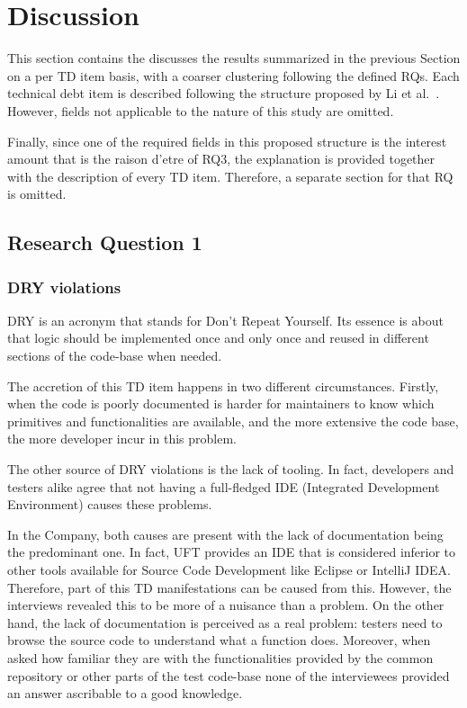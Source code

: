\chapter{Discussion} \label{sec:discussion}

This section contains the discusses the results summarized in the previous Section on a per TD item basis, with a coarser clustering following the defined RQs. Each technical debt item is described following the structure proposed by Li et al.\ \cite{mapping_study_td}. However, fields not applicable to the nature of this study are omitted.

Finally, since one of the required fields in this proposed structure is the interest amount that is the raison d'etre of RQ3, the explanation is provided together with the description of every TD item. Therefore, a separate section for that RQ is omitted.

\section{Research Question 1} \label{sec:disc-rq1}

    \subsection{DRY violations} \label{sec:res-dry-violations}

        DRY is an acronym that stands for Don't Repeat Yourself. Its essence is about that logic should be implemented once and only once and reused in different sections of the code-base when needed.

        The accretion of this TD item happens in two different circumstances. Firstly, when the code is poorly documented is harder for maintainers to know which primitives and functionalities are available, and the more extensive the code base, the more developer incur in this problem.

        The other source of DRY violations is the lack of tooling. In fact, developers and testers alike agree that not having a full-fledged IDE (Integrated Development Environment) causes these problems.

        In the Company, both causes are present with the lack of documentation being the predominant one. In fact, UFT provides an IDE that is considered inferior to other tools available for Source Code Development like Eclipse or IntelliJ IDEA. Therefore, part of this TD manifestations can be caused from this. However, the interviews revealed this to be more of a nuisance than a problem. On the other hand, the lack of documentation is perceived as a real problem: testers need to browse the source code to understand what a function does. Moreover, when asked how familiar they are with the functionalities provided by the common repository or other parts of the test code-base none of the interviewees provided an answer ascribable to a good knowledge.

